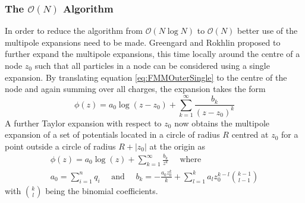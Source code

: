 \subsubsection{\texorpdfstring{The $\mathcal{O}(N)$ Algorithm}{The O(N) Algorithm}} \label{subsec:OrderNFMM}
In order to reduce the algorithm from $\mathcal{O}(N\log N)$ to $\mathcal{O}(N)$ better use of the multipole expansions need to be made. Greengard and Rokhlin proposed to further expand the multipole expansions, this time locally around the centre of a node $z_0$ such that all particles in a node can be considered using a single expansion.
By translating equation \cref{eq:FMMOuterSingle} to the centre of the node and again summing over all charges, the expansion takes the form
\begin{equation}
\label{eq:FMMOuterMultiTrans1}
    \phi(z) = a_0\log(z-z_0) + \sum_{k=1}^\infty \frac{b_k}{(z-z_0)^k}
\end{equation}
A further Taylor expansion with respect to $z_0$ now obtains the multipole expansion of a set of potentials located in a circle of radius $R$ centred at $z_0$ for a point outside a circle of radius $R+|z_0|$ at the origin as
\begin{equation}
\label{eq:FMMOuterMultiTrans2}
\begin{gathered}
    \phi(z) = a_0\log(z) + \sum_{k=1}^\infty \frac{b_k}{z^k} \quad \text{ where } \\
    a_0 = \sum_{i=1}^n q_i \quad \text{ and } \quad b_k = -\frac{a_0 z_0^k}{k} + \sum_{l=1}^{k} a_l z_0^{k-l} \binom{k-1}{l-1}
\end{gathered}
\end{equation}
with $\binom{k}{l}$ being the binomial coefficients.


